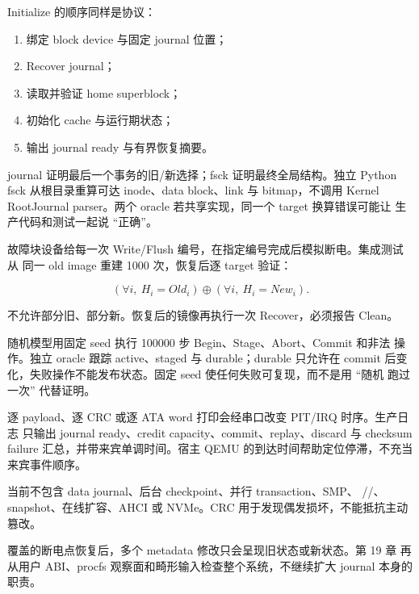 Initialize 的顺序同样是协议：

\begin{enumerate}
  \item 绑定 block device 与固定 journal 位置；
  \item Recover journal；
  \item 读取并验证 home superblock；
  \item 初始化 cache 与运行期状态；
  \item 输出 journal ready 与有界恢复摘要。
\end{enumerate}

journal 证明最后一个事务的旧/新选择；fsck 证明最终全局结构。独立 Python
fsck 从根目录重算可达 inode、data block、link 与 bitmap，不调用 Kernel
RootJournal parser。两个 oracle 若共享实现，同一个 target 换算错误可能让
生产代码和测试一起说 ``正确''。

故障块设备给每一次 Write/Flush 编号，在指定编号完成后模拟断电。集成测试从
同一 old image 重建 1000 次，恢复后逐 target 验证：

\[
(\forall i,\ H_i=Old_i)
\oplus
(\forall i,\ H_i=New_i).
\]

不允许部分旧、部分新。恢复后的镜像再执行一次 Recover，必须报告 Clean。

随机模型用固定 seed 执行 100000 步 Begin、Stage、Abort、Commit 和非法
操作。独立 oracle 跟踪 active、staged 与 durable；durable 只允许在 commit
后变化，失败操作不能发布状态。固定 seed 使任何失败可复现，而不是用 ``随机
跑过一次'' 代替证明。

逐 payload、逐 CRC 或逐 ATA word 打印会经串口改变 PIT/IRQ 时序。生产日志
只输出 journal ready、credit capacity、commit、replay、discard 与 checksum
failure 汇总，并带来宾单调时间。宿主 QEMU 的到达时间帮助定位停滞，不充当
来宾事件顺序。

当前不包含 data journal、后台 checkpoint、并行 transaction、SMP、
//、snapshot、在线扩容、AHCI 或
NVMe。CRC 用于发现偶发损坏，不能抵抗主动篡改。

覆盖的断电点恢复后，多个 metadata 修改只会呈现旧状态或新状态。第 19 章
再从用户 ABI、procfs 观察面和畸形输入检查整个系统，不继续扩大 journal
本身的职责。
